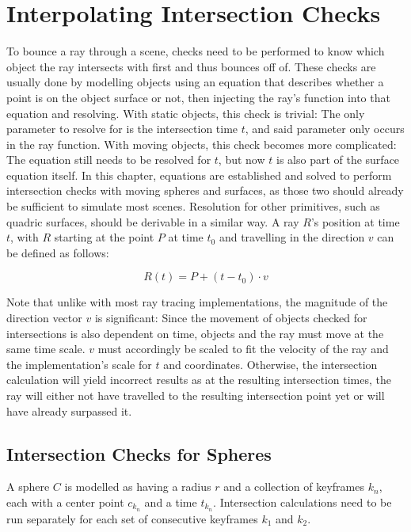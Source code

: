 \chapter{Interpolating Intersection Checks}

To bounce a ray through a scene, checks need to be performed to know which object the ray intersects with first and thus bounces off of.
These checks are usually done by modelling objects using an equation that describes whether a point is on the object surface or not,
then injecting the ray's function into that equation and resolving.
With static objects, this check is trivial:
The only parameter to resolve for is the intersection time \(t\), and said parameter only occurs in the ray function.
\newline
With moving objects, this check becomes more complicated: The equation still needs to be resolved for \(t\),
but now \(t\) is also part of the surface equation itself.
In this chapter, equations are established and solved to perform intersection checks with moving spheres and surfaces,
as those two should already be sufficient to simulate most scenes.
Resolution for other primitives, such as quadric surfaces, should be derivable in a similar way.
\newline
A ray \(R\)'s position at time \(t\), with \(R\) starting at the point \(P\) at time \(t_0\) and travelling in the direction \(v\) can be defined as follows:

\begin{equation}\label{RayEq}
    R(t) = P + (t - t_0) \cdot v
\end{equation}

Note that unlike with most ray tracing implementations, the magnitude of the direction vector \(v\) is significant:
Since the movement of objects checked for intersections is also dependent on time,
objects and the ray must move at the same time scale.
\(v\) must accordingly be scaled to fit the velocity of the ray and the implementation's scale for \(t\) and coordinates.
Otherwise, the intersection calculation will yield incorrect results as at the resulting intersection times,
the ray will either not have travelled to the resulting intersection point yet or will have already surpassed it.

\section{Intersection Checks for Spheres}

A sphere \(C\) is modelled as having a radius \(r\) and a collection of keyframes \(k_n\), each with a center point \(c_{k_n}\) and a time \(t_{k_n}\).
Intersection calculations need to be run separately for each set of consecutive keyframes \(k_1\) and \(k_2\).
\newline

